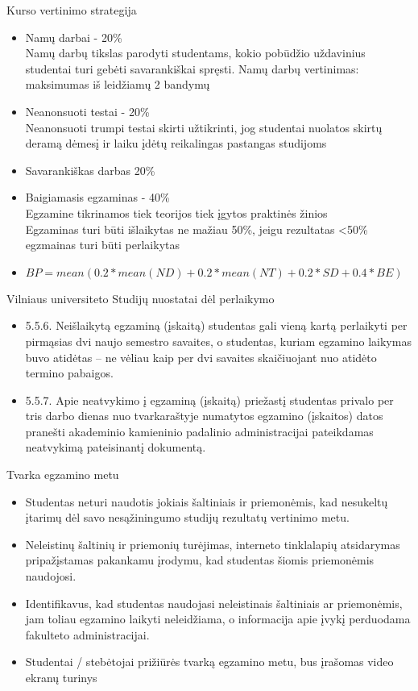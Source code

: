 \documentclass[11pt,xcolor=table]{beamer}
\begin{document}
\begin{frame}{Kurso vertinimo strategija}

\begin{itemize}
\item Namų darbai - 20\%
\\Namų darbų tikslas parodyti studentams, kokio pobūdžio uždavinius studentai turi gebėti savarankiškai spręsti. Namų darbų vertinimas: maksimumas iš leidžiamų 2 bandymų
\item Neanonsuoti testai - 20\%
\\Neanonsuoti trumpi testai skirti užtikrinti, jog studentai nuolatos skirtų deramą dėmesį ir laiku įdėtų reikalingas pastangas studijoms
\item Savarankiškas darbas 20\%
\item Baigiamasis egzaminas - 40\% 
\\Egzamine tikrinamos tiek teorijos tiek įgytos praktinės žinios 
\\Egzaminas turi būti išlaikytas ne mažiau 50\%, jeigu rezultatas <50\% egzmainas turi būti perlaikytas
\item $BP=mean(0.2*mean(ND)+0.2*mean(NT)+0.2*SD +0.4*BE)$
\end{itemize}
\end{frame}


\begin{frame}{Vilniaus universiteto Studijų nuostatai dėl perlaikymo}
\begin{itemize}
\item 5.5.6. Neišlaikytą egzaminą (įskaitą) studentas gali vieną kartą perlaikyti per pirmąsias dvi naujo semestro savaites, o studentas, kuriam egzamino laikymas buvo atidėtas – ne vėliau kaip per dvi savaites skaičiuojant nuo atidėto termino pabaigos.
\item 5.5.7. Apie neatvykimo į egzaminą (įskaitą) priežastį studentas privalo per tris darbo dienas nuo tvarkaraštyje numatytos egzamino (įskaitos) datos pranešti akademinio kamieninio padalinio administracijai pateikdamas neatvykimą pateisinantį dokumentą.
\end{itemize}
\end{frame}

\begin{frame}{Tvarka egzamino metu}
\begin{itemize}
\item Studentas neturi naudotis jokiais šaltiniais ir
priemonėmis, kad nesukeltų įtarimų dėl savo
nesąžiningumo studijų rezultatų vertinimo metu.
\item  Neleistinų šaltinių ir priemonių turėjimas, interneto
tinklalapių atsidarymas pripažįstamas pakankamu
įrodymu, kad studentas šiomis priemonėmis
naudojosi.
\item  Identifikavus, kad studentas naudojasi neleistinais
šaltiniais ar priemonėmis, jam toliau egzamino laikyti
neleidžiama, o informacija apie įvykį perduodama
fakulteto administracijai.
\item Studentai / stebėtojai prižiūrės tvarką egzamino
metu, bus įrašomas video ekranų turinys
\end{itemize}
\end{frame}
\end{document}
